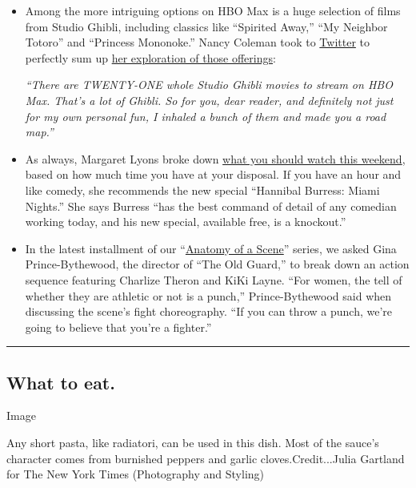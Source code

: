 \begin{itemize}
\item
  Among the more intriguing options on HBO Max is a huge selection of
  films from Studio Ghibli, including classics like ``Spirited Away,''
  ``My Neighbor Totoro'' and ``Princess Mononoke.'' Nancy Coleman took
  to
  \href{https://twitter.com/nancylcoleman/status/1283785775721721857}{Twitter}
  to perfectly sum up
  \href{https://www.nytimes.com/2020/07/16/movies/studio-ghibli-hbo-max.html}{her
  exploration of those offerings}:

  \emph{``There are TWENTY-ONE whole Studio Ghibli movies to stream on
  HBO Max. That's a lot of Ghibli. So for you, dear reader, and
  definitely not just for my own personal fun, I inhaled a bunch of them
  and made you a road map.''}
\item
  As always, Margaret Lyons broke down
  \href{https://www.nytimes.com/2020/07/16/arts/television/hannibal-buress-my-cat-from-hell.html}{what
  you should watch this weekend}, based on how much time you have at
  your disposal. If you have an hour and like comedy, she recommends the
  new special ``Hannibal Burress: Miami Nights.'' She says Burress ``has
  the best command of detail of any comedian working today, and his new
  special, available free, is a knockout.''
\item
  In the latest installment of our
  ``\href{https://www.nytimes.com/2020/07/17/movies/the-old-guard-clip.html}{Anatomy
  of a Scene}'' series, we asked Gina Prince-Bythewood, the director of
  ``The Old Guard,'' to break down an action sequence featuring Charlize
  Theron and KiKi Layne. ``For women, the tell of whether they are
  athletic or not is a punch,'' Prince-Bythewood said when discussing
  the scene's fight choreography. ``If you can throw a punch, we're
  going to believe that you're a fighter.''
\end{itemize}

\begin{center}\rule{0.5\linewidth}{\linethickness}\end{center}

\hypertarget{what-to-eat}{%
\subsection{What to eat.}\label{what-to-eat}}

Image

Any short pasta, like radiatori, can be used in this dish. Most of the
sauce's character comes from burnished peppers and garlic
cloves.Credit...Julia Gartland for The New York Times (Photography and
Styling)

